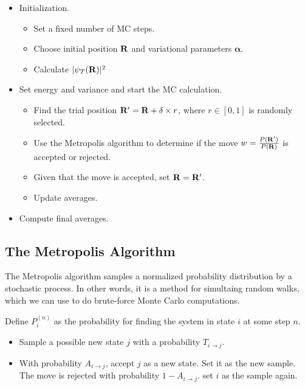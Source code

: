 \documentclass[twocolumn]{article}[10pt]
\renewcommand\vec[1]{{\bf #1}}
\begin{document}
\begin{itemize}
    \item Initialization.
    \begin{itemize}    
        \item Set a fixed number of MC steps.
        \item Choose initial position $\vec R$ and variational
            parameters $\boldsymbol\alpha$.
        \item Calculate $|\psi_T(\vec R)|^2$
    \end{itemize}
    \item Set energy and variance and start the MC calculation.
    \begin{itemize}    
        \item Find the trial position $\vec R' =\vec R + \delta\times r $,
            where $r\in [0,1]$ is randomly selected.
        \item Use the Metropolis algorithm to determine if the
            move $w =\frac{P(\vec R')}{P(\vec R)}$ is accepted or rejected.
        \item Given that the move is accepted, set $\vec R = \vec R'$.
        \item Update averages.
    \end{itemize}
    \item Compute final averages.
\end{itemize}

\subsection{The Metropolis Algorithm}
The Metropolis algorithm samples a normalized probability distribution
by a stochastic process. In other words, it is a method for simultaing
random walks, which we can use to do brute-force Monte Carlo computations.

Define $P^{(n)}_i$ as the probability for finding the system in state $i$
at some step $n$.

\begin{itemize}
	\item Sample a possible new state $j$ with a probability $T_{i\rightarrow j}$.
	\item With probability $A_{i\rightarrow j}$, accept $j$ as a new state.
	Set it as the new sample. The move is rejected with probability $1-A_{i\rightarrow j}$.
	set $i$ as the sample again.
\end{itemize}
\end{document}

